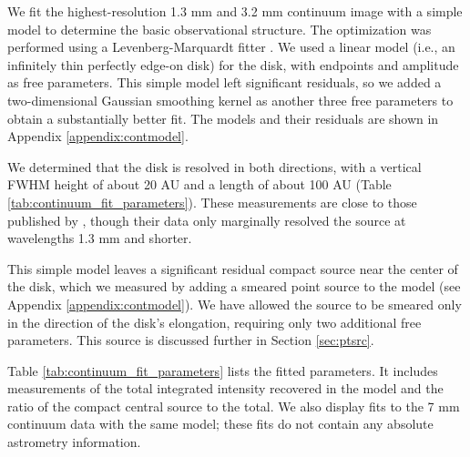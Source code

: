 \documentclass[twocolumn]{aastex62}
\newcommand{\sourcei}{SrcI\xspace}
\begin{document}

We fit the highest-resolution 1.3 mm and 3.2 mm continuum image with a simple
model to determine the basic
observational structure.
The optimization was performed using a Levenberg-Marquardt
fitter \citep{Newville2014a}. 
We used a linear model (i.e., an infinitely thin
perfectly edge-on disk) for the disk, with endpoints and amplitude as free parameters.
This simple model left significant residuals, so we added a two-dimensional
Gaussian smoothing kernel as another three free parameters to obtain a
substantially better fit.
The models and their residuals
are shown in Appendix \ref{appendix:contmodel}.

We determined that the disk is resolved in both
directions, with a vertical FWHM height of about 20 AU and a length of about
100 AU (Table \ref{tab:continuum_fit_parameters}).  These measurements
are close to those published by \citet{Plambeck2016a}, though their data
only marginally resolved the source at wavelengths 1.3 mm and shorter.

This simple model leaves a significant residual compact source near the center
of the disk, which we measured by adding a smeared point source to the model
(see Appendix \ref{appendix:contmodel}).  We have allowed the source to be
smeared only in the direction of the disk's elongation, requiring only two
additional free parameters.  This source is discussed further in Section
\ref{sec:ptsrc}.

Table \ref{tab:continuum_fit_parameters} lists the fitted parameters.  It 
includes measurements of the total integrated intensity recovered in the model
and the ratio of the compact central source to the total.  We also display
fits to the \citet{Reid2007a} 7 mm continuum data with the same model;
these fits do not contain any absolute astrometry information.
\end{document}
